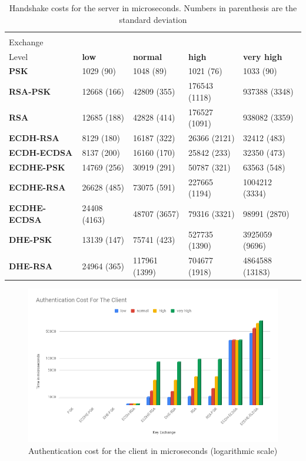 				\begin{table}[]
				  \begin{tabular}{|l|l|l|l|l|}
				  \hline
				   \backslashbox{Key\\Exchange}{Security\\Level}                    & \textbf{low} & \textbf{normal} & \textbf{high} & \textbf{very high} \\ \hline
				  \textbf{PSK}         & 1029 (90)     & 1048 (89)        & 1021 (76)      & 1033 (90)           \\ \hline
				  \textbf{RSA-PSK}     & 12668 (166)   & 42809 (355)      & 176543 (1118)  & 937388 (3348)       \\ \hline
				  \textbf{RSA}         & 12685 (188)   & 42828 (414)      & 176527 (1091)  & 938082 (3359)       \\ \hline
				  \textbf{ECDH-RSA}    & 8129 (180)    & 16187 (322)      & 26366 (2121)   & 32412 (483)         \\ \hline
				  \textbf{ECDH-ECDSA}  & 8137 (200)    & 16160 (170)      & 25842 (233)    & 32350 (473)         \\ \hline
				  \textbf{ECDHE-PSK}   & 14769 (256)   & 30919 (291)      & 50787 (321)    & 63563 (548)         \\ \hline
				  \textbf{ECDHE-RSA}   & 26628 (485)   & 73075 (591)      & 227665 (1194)  & 1004212 (3334)      \\ \hline
				  \textbf{ECDHE-ECDSA} & 24408 (4163)  & 48707 (3657)     & 79316 (3321)   & 98991 (2870)        \\ \hline
				  \textbf{DHE-PSK}     & 13139 (147)   & 75741 (423)      & 527735 (1390)  & 3925059 (9696)      \\ \hline
				  \textbf{DHE-RSA}     & 24964 (365)   & 117961 (1399)    & 704677 (1918)  & 4864588 (13183)     \\ \hline
				  \end{tabular}
				  \caption{Handshake costs for the server in microseconds. Numbers in parenthesis are the standard deviation}
				  \label{table:server-hs-costs-papi}
				  \end{table}
  
				  \begin{figure}
					\centering
					\includegraphics[width=1.0\textwidth]{img/papi-client-auth-cost.png}
					\centering \caption{Authentication cost for the client in microseconds (logarithmic scale)}
				  \end{figure}
  
